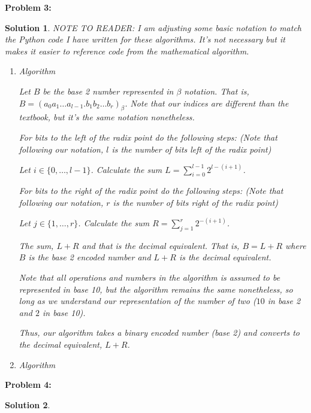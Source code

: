 \documentclass[12pt, letterpaper]{article}
\theoremstyle{nonumberplain}
\newtheorem{sol}{Solution}
\begin{document}
\hspace{18pt}\textbf{Problem 3:} \medskip
\begin{sol}
    NOTE TO READER: I am adjusting some basic notation to match the Python code I have written for these algorithms. It's not necessary but it makes it easier to reference code from the mathematical algorithm.
    \begin{enumerate}[label=\alph*)]
        \item Algorithm

            Let $B$ be the base 2 number represented in $\beta$ notation. That is, $B = (a_0 a_1 \ldots a_{l-1}.b_1 b_2 \ldots b_r)_\beta$. Note that our indices are different than the textbook, but it's the same notation nonetheless.

            For bits to the left of the radix point do the following steps: (Note that following our notation, $l$ is the number of bits left of the radix point)

            Let $i\in \{0, \ldots, l-1\}$. Calculate the sum $L = \sum_{i=0}^{l-1}2^{l - (i+1)}$.

            For bits to the right of the radix point do the following steps: (Note that following our notation, $r$ is the number of bits right of the radix point)

            Let $j\in \{1, \ldots, r\}$. Calculate the sum $R = \sum_{j=1}^r 2^{-(i+1)}$.

            The sum, $L+R$ and that is the decimal equivalent. That is, $B = L+R$ where $B$ is the base 2 encoded number and $L+R$ is the decimal equivalent. 

            Note that all operations and numbers in the algorithm is assumed to be represented in base 10, but the algorithm remains the same nonetheless, so long as we understand our representation of the number of two ($10$ in base 2 and $2$ in base 10).

            Thus, our algorithm takes a binary encoded number (base 2) and converts to the decimal equivalent, $L+R$.


        \item Algorithm


    \end{enumerate}
\end{sol}

\hspace{18pt}\textbf{Problem 4:} \medskip
\begin{sol}
    
\end{sol}
\end{document}
